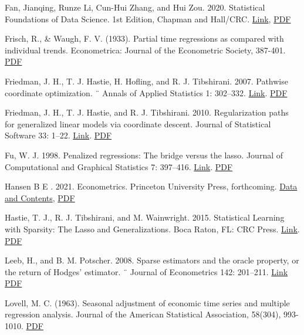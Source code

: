 {Fan, Jianqing, Runze Li, Cun-Hui Zhang, and Hui Zou. 2020. Statistical Foundations of Data Science. 1st Edition, Chapman and Hall/CRC. \href{https://doi.org/10.1201/9780429096280}{Link}, \href{http://sci-hub.ren/10.1201/9780429096280}{PDF}

Frisch, R., \& Waugh, F. V. (1933). Partial time regressions as compared with individual trends. Econometrica: Journal of the Econometric Society, 387-401. \href{http://sci-hub.ren/10.2307/1907330}{PDF} 

Friedman, J. H., T. J. Hastie, H. Hofling, and R. J. Tibshirani. 2007. Pathwise coordinate optimization. ¨ Annals of
Applied Statistics 1: 302–332. \href{https://doi.org/10.1214/07-AOAS131}{Link}. \href{http://sci-hub.ren/10.1214/07-AOAS131}{PDF}

Friedman, J. H., T. J. Hastie, and R. J. Tibshirani. 2010. Regularization paths for generalized linear models via
coordinate descent. Journal of Statistical Software 33: 1–22. \href{https://doi.org/10.18637/jss.v033.i01}{Link}. \href{http://sci-hub.ren/10.18637/jss.v033.i01}{PDF}

Fu, W. J. 1998. Penalized regressions: The bridge versus the lasso. Journal of Computational and Graphical Statistics
7: 397–416. \href{https://doi.org/10.1080/10618600.1998.10474784}{Link}. \href{http://sci-hub.ren/10.1080/10618600.1998.10474784}{PDF}

Hansen B E . 2021. Econometrics. Princeton University Press, forthcoming. \href{https://www.ssc.wisc.edu/~bhansen/econometrics/}{Data and Contents}, \href{https://www.ssc.wisc.edu/~bhansen/econometrics/Econometrics.pdf}{PDF}

Hastie, T. J., R. J. Tibshirani, and M. Wainwright. 2015. Statistical Learning with Sparsity: The Lasso and
Generalizations. Boca Raton, FL: CRC Press. \href{https://web.stanford.edu/~hastie/StatLearnSparsity/}{Link}. \href{https://web.stanford.edu/~hastie/StatLearnSparsity_files/SLS.pdf}{PDF}

Leeb, H., and B. M. Potscher. 2008. Sparse estimators and the oracle property, or the return of Hodges’ estimator. ¨
Journal of Econometrics 142: 201–211. \href{https://doi.org/10.1016/j.jeconom.2007.05.017}{Link} \href{http://sci-hub.ren/10.1016/j.jeconom.2007.05.017}{PDF}

Lovell, M. C. (1963). Seasonal adjustment of economic time series and multiple regression analysis. Journal of the American Statistical Association, 58(304), 993-1010. \href{http://sci-hub.ren/10.1080/01621459.1963.10480682}{PDF}

}
